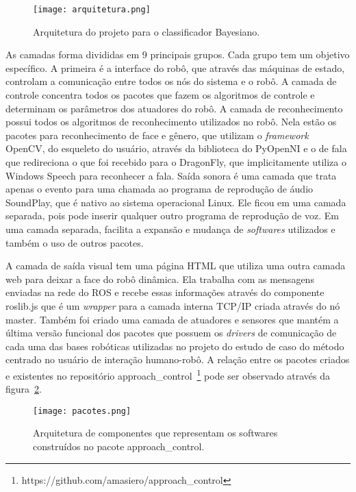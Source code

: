 \begin{figure}[ht!]
	\centering
	\begin{minipage}{0.9\textwidth}
		\caption{Arquitetura do projeto para o classificador Bayesiano.}
		\texttt{[image: arquitetura.png]}
		\label{fig:arquitetura}
	\end{minipage}
\end{figure}

As camadas forma divididas em 9 principais grupos. Cada grupo tem um objetivo específico. A primeira é a interface do robô, que através das máquinas de estado, controlam a comunicação entre todos os nós do sistema e o robô. A camada de controle concentra todos os pacotes que fazem os algoritmos de controle e determinam os parâmetros dos atuadores do robô. A camada de reconhecimento possui todos os algoritmos de reconhecimento utilizados no robô. Nela estão os pacotes para reconhecimento de face e gênero, que utilizam o \textit{framework} OpenCV, do esqueleto do usuário, através da biblioteca do PyOpenNI e o de fala que redireciona o que foi recebido para o DragonFly, que implicitamente utiliza o Windows Speech para reconhecer a fala. Saída sonora é uma camada que trata apenas o evento para uma chamada ao programa de reprodução de áudio SoundPlay, que é nativo ao sistema operacional Linux. Ele ficou em uma camada separada, pois pode inserir qualquer outro programa de reprodução de voz. Em uma camada separada, facilita a expansão e mudança de \textit{softwares} utilizados e também o uso de outros pacotes.

A camada de saída visual tem uma página HTML que utiliza uma outra camada web para deixar a face do robô dinâmica. Ela trabalha com as mensagens enviadas na rede do ROS e recebe essas informações através do componente roslib.js que é um \textit{wrapper} para a camada interna TCP/IP criada através do nó master. Também foi criado uma camada de atuadores e sensores que mantém a última versão funcional dos pacotes que possuem os \textit{drivers} de comunicação de cada uma das bases robóticas utilizadas no projeto do estudo de caso do método centrado no usuário de interação humano-robô. A relação entre os pacotes criados e existentes no repositório approach\_control~\footnote{https://github.com/amasiero/approach\_control} pode ser observado através da figura~\ref{fig:pacotes}.

\begin{figure}[ht!]
	\centering
	\begin{minipage}{0.9\textwidth}
		\caption{Arquitetura de componentes que representam os softwares construídos no pacote approach\_control.}
		\texttt{[image: pacotes.png]}
		\label{fig:pacotes}
	\end{minipage}
\end{figure}

